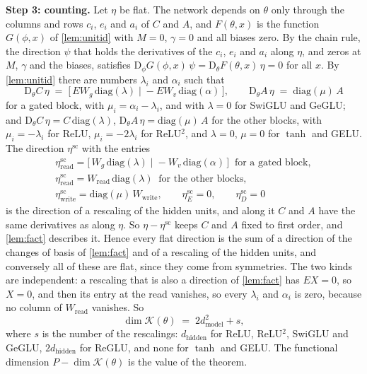 \documentclass[10pt]{article}
\theoremstyle{definition}
\theoremstyle{remark}
\newcommand{\Wread}{W_{\mathrm{read}}}
\newcommand{\Wwrite}{W_{\mathrm{write}}}
\newcommand{\dm}{d_{\mathrm{model}}}
\newcommand{\dhid}{d_{\mathrm{hidden}}}
\newcommand{\Der}{\mathrm{D}}
\newcommand{\para}[1]{\smallskip\noindent\textbf{#1}\hspace{0.5em}}
\begin{document}
\para{Step 3: counting.} Let $\eta$ be flat. The network depends on $\theta$ only through the columns and rows $c_i$, $e_i$ and $a_i$ of $C$ and $A$, and $F(\theta, x)$ is the function $G(\phi, x)$ of \cref{lem:unitid} with $M = 0$, $\gamma = 0$ and all biases zero. By the chain rule, the direction $\psi$ that holds the derivatives of the $c_i$, $e_i$ and $a_i$ along $\eta$, and zeros at $M$, $\gamma$ and the biases, satisfies $\Der_\phi G(\phi, x)\,\psi = \Der_\theta F(\theta, x)\,\eta = 0$ for all $x$. By \cref{lem:unitid} there are numbers $\lambda_i$ and $\alpha_i$ such that
\[
\Der_\theta C\,\eta \;=\; \big[\,EW_g\,\mathrm{diag}(\lambda) \;\big|\; -EW_v\,\mathrm{diag}(\alpha)\,\big], \qquad \Der_\theta A\,\eta \;=\; \mathrm{diag}(\mu)\,A
\]
for a gated block, with $\mu_i = \alpha_i - \lambda_i$, and with $\lambda = 0$ for SwiGLU and GeGLU; and $\Der_\theta C\,\eta = C\,\mathrm{diag}(\lambda)$, $\Der_\theta A\,\eta = \mathrm{diag}(\mu)\,A$ for the other blocks, with $\mu_i = -\lambda_i$ for ReLU, $\mu_i = -2\lambda_i$ for ReLU$^2$, and $\lambda = 0$, $\mu = 0$ for $\tanh$ and GELU. The direction $\eta^{\mathrm{sc}}$ with the entries
\begin{gather*}
\eta^{\mathrm{sc}}_{\mathrm{read}} = \big[\,W_g\,\mathrm{diag}(\lambda) \;\big|\; -W_v\,\mathrm{diag}(\alpha)\,\big] \ \text{ for a gated block}, \\
\eta^{\mathrm{sc}}_{\mathrm{read}} = \Wread\,\mathrm{diag}(\lambda) \ \text{ for the other blocks},\\
\eta^{\mathrm{sc}}_{\mathrm{write}} = \mathrm{diag}(\mu)\,\Wwrite, \qquad \eta^{\mathrm{sc}}_E = 0, \qquad \eta^{\mathrm{sc}}_D = 0
\end{gather*}
is the direction of a rescaling of the hidden units, and along it $C$ and $A$ have the same derivatives as along $\eta$. So $\eta - \eta^{\mathrm{sc}}$ keeps $C$ and $A$ fixed to first order, and \cref{lem:fact} describes it. Hence every flat direction is the sum of a direction of the changes of basis of \cref{lem:fact} and of a rescaling of the hidden units, and conversely all of these are flat, since they come from symmetries. The two kinds are independent: a rescaling that is also a direction of \cref{lem:fact} has $EX = 0$, so $X = 0$, and then its entry at the read vanishes, so every $\lambda_i$ and $\alpha_i$ is zero, because no column of $\Wread$ vanishes. So
\[
\dim\mathcal K(\theta) \;=\; 2\dm^2 + s ,
\]
where $s$ is the number of the rescalings: $\dhid$ for ReLU, ReLU$^2$, SwiGLU and GeGLU, $2\dhid$ for ReGLU, and none for $\tanh$ and GELU. The functional dimension $P - \dim\mathcal K(\theta)$ is the value of the theorem.
\end{document}
